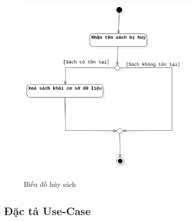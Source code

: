 \documentclass[../report.tex]{subfiles}
\begin{document}
\begin{figure}[H]
\centering
\includegraphics[width=9cm]{figures/huysach.png}
\caption{Biểu đồ hủy sách}
\end{figure}

\subsection{Đặc tả Use-Case}
\end{document}
